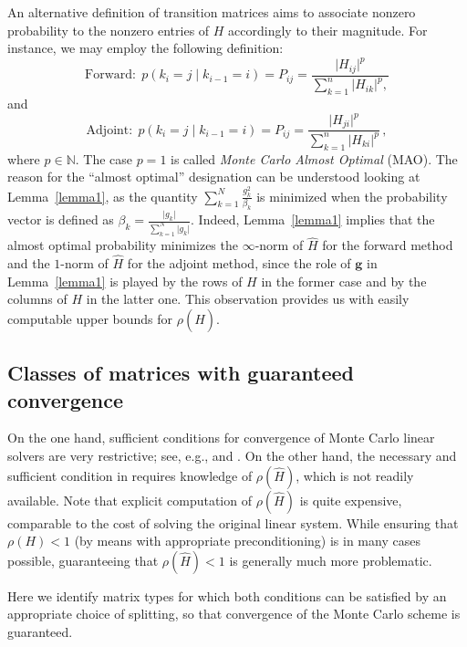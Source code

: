 \documentclass[final,leqno,onefignum,onetabnum]{siamltex1213}
\begin{document}
An alternative definition of transition matrices aims to associate nonzero
probability to the nonzero entries of $H$ accordingly to their magnitude. For
instance, we may employ the following definition:
\[
\text{Forward}: \;
p(k_i=j \;\lvert\;k_{i-1}=i )=P_{ij}=\frac{\lvert
H_{ij}\rvert^p}{\sum_{k=1}^n
\lvert H_{ik}\rvert^p,}
\]
and
\[
\text{Adjoint}: \;
p(k_i=j \;\lvert\;k_{i-1}=i )=P_{ij}=\frac{\lvert
H_{ji}\rvert^p}{\sum_{k=1}^n
\lvert H_{ki}\rvert^p} \,,
\]
where $p\in \mathbb{N}$.
The case $p=1$ is called
\textit{Monte Carlo Almost Optimal} (MAO).
The reason for the ``almost optimal'' designation can be understood looking
at
Lemma~\ref{lemma1}, as the quantity
$\sum_{k=1}^N\frac{g_k^2}{\beta_k}$
is minimized when the probability vector is
defined as $\displaystyle \beta_k=\frac{\lvert
g_k\rvert}{\sum_{k=1}^N \lvert
g_k\rvert}$. Indeed, Lemma~\ref{lemma1} implies that the almost optimal probability
minimizes the
$\infty$-norm of $\hat{H}$ for the forward method and the $1$-norm of $\hat{H}$
for the adjoint method, since the role of $\mathbf{g}$ in Lemma~\ref{lemma1} is played
by the rows of $H$ in the former case and by the columns of $H$ in the latter one.
This observation provides us with easily computable upper bounds for
$\rho(\hat{H})$.

\subsection{Classes of matrices with guaranteed convergence}

On the one hand, sufficient conditions for
convergence of Monte Carlo linear solvers are very restrictive; see, e.g.,
\cite{Srin2010} and \cite{MASC2013}. On the other hand, the necessary and
sufficient
condition in \cite{MASC2013} requires knowledge of $\rho(\hat{H})$, which
is not readily available. Note that explicit computation of $\rho(\hat{H})$
is quite expensive, comparable to the cost of solving the original linear system.
While ensuring that $\rho(H)<1$ (by means with appropriate preconditioning)
is in many cases possible, guaranteeing that $\rho(\hat{H})<1$ is generally
much more problematic.

Here we identify matrix types for which both conditions can be satisfied
by an appropriate choice of splitting, so that convergence of the Monte Carlo scheme
is guaranteed.

\end{document}
